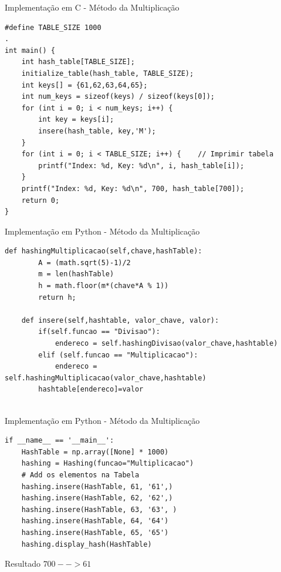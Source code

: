 \documentclass{beamer}
\begin{document}
\begin{frame}[fragile]{Implementação em C - Método da Multiplicação}
\footnotesize
\begin{lstlisting}[style=CStyle]
#define TABLE_SIZE 1000
.
int main() {
    int hash_table[TABLE_SIZE];
    initialize_table(hash_table, TABLE_SIZE);
    int keys[] = {61,62,63,64,65};
    int num_keys = sizeof(keys) / sizeof(keys[0]);
    for (int i = 0; i < num_keys; i++) {
        int key = keys[i];
        insere(hash_table, key,'M');
    }
    for (int i = 0; i < TABLE_SIZE; i++) {    // Imprimir tabela
        printf("Index: %d, Key: %d\n", i, hash_table[i]);
    }
    printf("Index: %d, Key: %d\n", 700, hash_table[700]);
    return 0;
}

\end{lstlisting}
\end{frame}



\begin{frame}[fragile]{Implementação em Python - Método da Multiplicação}
\centering\footnotesize
\begin{lstlisting}[style=PythonStyle]
    def hashingMultiplicacao(self,chave,hashTable):
        A = (math.sqrt(5)-1)/2
        m = len(hashTable)
        h = math.floor(m*(chave*A % 1))
        return h;

    def insere(self,hashtable, valor_chave, valor):
        if(self.funcao == "Divisao"):
            endereco = self.hashingDivisao(valor_chave,hashtable)
        elif (self.funcao == "Multiplicacao"):
            endereco = self.hashingMultiplicacao(valor_chave,hashtable)
        hashtable[endereco]=valor
    
\end{lstlisting}


\end{frame} 

\begin{frame}[fragile]{Implementação em Python - Método da Multiplicação}
\centering\footnotesize
\begin{lstlisting}[style=PythonStyle]
if __name__ == '__main__':
    HashTable = np.array([None] * 1000)
    hashing = Hashing(funcao="Multiplicacao")
    # Add os elementos na Tabela
    hashing.insere(HashTable, 61, '61',)
    hashing.insere(HashTable, 62, '62',)
    hashing.insere(HashTable, 63, '63', )
    hashing.insere(HashTable, 64, '64')
    hashing.insere(HashTable, 65, '65')
    hashing.display_hash(HashTable)   
\end{lstlisting}
\begin{block}{Resultado}
$700 --> 61$ \\
\end{block}

\end{frame} 
\end{document}
